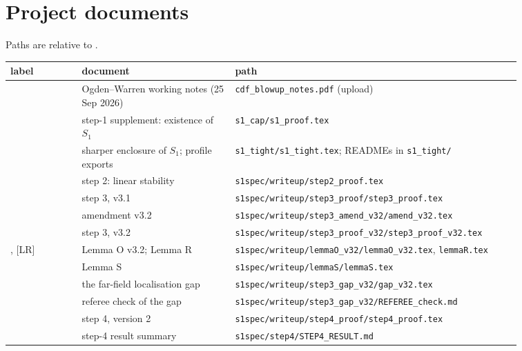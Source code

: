 \documentclass[11pt]{amsart}
\theoremstyle{definition}
\theoremstyle{remark}
\newcommand{\fn}[1]{\texttt{\detokenize{#1}}}
\newcommand{\dref}[1]{[\textsf{#1}]}
\newcommand{\pth}[1]{\nolinkurl{#1}}
\begin{document}
\section{Project documents}\label{app:docs}
Paths are relative to \fn{/home/claude/}.
\begin{center}
\footnotesize
\begin{tabular}{@{}lp{0.30\linewidth}p{0.56\linewidth}@{}}\toprule
label & document & path\\\midrule
\dref{OW} & Ogden--Warren working notes (25 Sep 2026) & \pth{cdf_blowup_notes.pdf} (upload)\\
\dref{S1} & step-1 supplement: existence of $S_1$ & \pth{s1_cap/s1_proof.tex}\\
\dref{S1t} & sharper enclosure of $S_1$; profile exports & \pth{s1_tight/s1_tight.tex}; READMEs in \pth{s1_tight/}\\
\dref{S2} & step 2: linear stability & \pth{s1spec/writeup/step2_proof.tex}\\
\dref{S3} & step 3, v3.1 & \pth{s1spec/writeup/step3_proof/step3_proof.tex}\\
\dref{S3a} & amendment v3.2 & \pth{s1spec/writeup/step3_amend_v32/amend_v32.tex}\\
\dref{S3'} & step 3, v3.2 & \pth{s1spec/writeup/step3_proof_v32/step3_proof_v32.tex}\\
\dref{LO}, \dref{LR} & Lemma O v3.2; Lemma R & \pth{s1spec/writeup/lemmaO_v32/lemmaO_v32.tex}, \pth{lemmaR.tex}\\
\dref{LS} & Lemma S & \pth{s1spec/writeup/lemmaS/lemmaS.tex}\\
\dref{GAP} & the far-field localisation gap & \pth{s1spec/writeup/step3_gap_v32/gap_v32.tex}\\
\dref{REF} & referee check of the gap & \pth{s1spec/writeup/step3_gap_v32/REFEREE_check.md}\\
\dref{S4} & step 4, version 2 & \pth{s1spec/writeup/step4_proof/step4_proof.tex}\\
\dref{R4} & step-4 result summary & \pth{s1spec/step4/STEP4_RESULT.md}\\\bottomrule
\end{tabular}\end{center}



\end{document}
